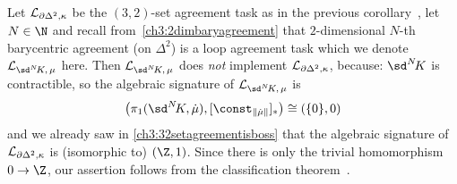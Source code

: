 \begin{thCorollary}
    Let $\mathcal{L}_{\partial\Delta^2,\kappa}$ be the $(3,2)$-set agreement task as
    in the previous corollary~, let $N\in\N$ and
    recall from~\cref{ch3:2dimbaryagreement} that $2$-dimensional $N$-th
    barycentric agreement (on $\Delta^2$) is a loop agreement task which we
    denote $\Loop{\sdNK,\,\mu}$ here. Then $\Loop{\sdNK,\,\mu}$ does
    \emph{not} implement $\mathcal{L}_{\partial\Delta^2,\kappa}$, because:
    $\sdNK$ is contractible, so the algebraic signature of
    $\Loop{\sdNK,\,\mu}$ is
    \[ \bigl( \pi_1(\sdNK,\dot\mu), [\const_{\geom{\dot\mu}}]_\ast
        \bigr) \cong (\{0\}, 0)
    \]
    and we already saw in \cref{ch3:32setagreementisboss} that the algebraic
    signature of $\mathcal{L}_{\partial\Delta^2,\kappa}$ is (isomorphic to) $(\Z,1)$.
    Since there is only the trivial homomorphism $0\to\Z$, our assertion follows
    from the classification theorem~.
\end{thCorollary}
